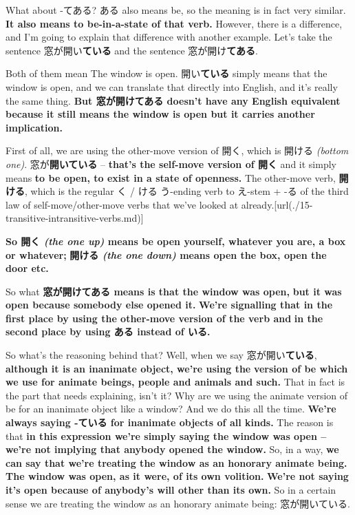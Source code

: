 What about -てある? ある also means be, so the meaning is in fact very similar. {\bf It also means to be-in-a-state of that verb.} However, there is a difference, and I'm going to explain that difference with another example. Let's take the sentence 窓が開い{\bf ている} and the sentence 窓が開け{\bf てある}.

{}

Both of them mean The window is open. 開い{\bf ている} simply means that the window is open, and we can translate that directly into English, and it's really the same thing. {\bf But 窓が開けてある doesn't have any English equivalent} {\bf because it still means the window is open but it carries another implication.}

{}

First of all, we are using the other-move version of 開く, which is 開ける {\em (bottom one)}. 窓が{\bf 開いている} -- {\bf that's the self-move version of 開く} and it simply means {\bf to be open, to exist in a state of openness.} The other-move verb, {\bf 開ける}, which is the regular く / ける う-ending verb to え-stem + -る of the third law of self-move/other-move verbs that we've looked at already.\goto{{[}15{]}}[url(./15-transitive-intransitive-verbs.md)]

{}

{\bf So 開く {\em (the one up)} means be open yourself, whatever you are, a box or whatever;} {\bf 開ける {\em (the one down)} means open the box, open the door etc.}

{}

So what {\bf 窓が開けてある means is that the window was open,} {\bf but it was open because somebody else opened it.} {\bf We're signalling that in the first place by using the other-move version of the verb and} {\bf in the second place by using ある instead of いる.}

{}

So what's the reasoning behind that? Well, when we say 窓が開い{\bf ている}, {\bf although it is an inanimate object, we're using the} {\bf version of be which we use for animate beings, people and animals and such.} That in fact is the part that needs explaining, isn't it? Why are we using the animate version of be for an inanimate object like a window? And we do this all the time. {\bf We're always saying -ている for inanimate objects of all kinds.} The reason is that {\bf in this expression we're simply saying the window was open --} {\bf we're not implying that anybody opened the window.} So, in a way, {\bf we can say that we're treating the window as an honorary animate being.} {\bf The window was open, as it were, of its own volition.} {\bf We're not saying it's open because of anybody's will other than its own.} So in a certain sense we are treating the window as an honorary animate being: 窓が開いている.

